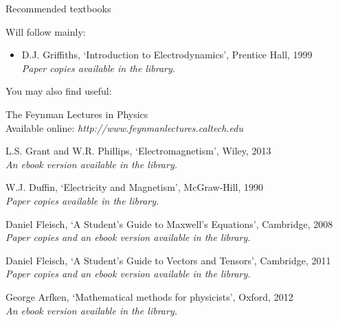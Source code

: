\begin{frame}{Recommended textbooks}

Will follow mainly:
\begin{itemize}
    \item D.J. Griffiths, `Introduction to Electrodynamics', Prentice Hall, 1999\\
          {\it Paper copies available in the library.}
\end{itemize}

You may also find useful:
\begin{itemize}
{\footnotesize
    \item The Feynman Lectures in Physics\\
          Available online: {\it http://www.feynmanlectures.caltech.edu}
    \item L.S. Grant and W.R. Phillips, `Electromagnetism', Wiley, 2013\\
         {\it An ebook version available in the library.}
    \item W.J. Duffin, `Electricity and Magnetism', McGraw-Hill, 1990\\
          {\it Paper copies available in the library.}
    \item Daniel Fleisch, `A Student's Guide to Maxwell's Equations', Cambridge, 2008\\
         {\it Paper copies and an ebook version available in the library.}
    \item Daniel Fleisch, `A Student's Guide to Vectors and Tensors', Cambridge, 2011\\
         {\it Paper copies and an ebook version available in the library.}
    \item George Arfken, `Mathematical methods for physicists', Oxford, 2012\\
         {\it An ebook version available in the library.}
}
\end{itemize}

\end{frame}


%
%
%

